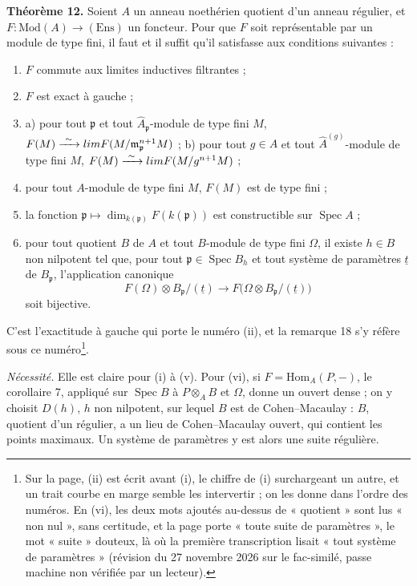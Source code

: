 \documentclass[11pt,a4paper]{article}
\begin{document}
\textbf{Théorème 12.} Soient $A$ un anneau noethérien quotient d'un anneau
régulier, et $F \colon \mathrm{Mod}(A) \to (\mathrm{Ens})$ un foncteur. Pour
que $F$ soit représentable par un module de type fini, il faut et il suffit
qu'il satisfasse aux conditions suivantes :
\begin{enumerate}
\item[(i)] $F$ commute aux limites inductives filtrantes ;
\item[(ii)] $F$ est exact à gauche ;
\item[(iii)] a) pour tout $\mathfrak{p}$ et tout
$\widehat{A}_{\mathfrak{p}}$-module de type fini $M$,
$F(M) \xrightarrow{\ \sim\ } \varprojlim F(M/\mathfrak{m}_{\mathfrak{p}}^{n+1}M)$ ;
b) pour tout $g \in A$ et tout $\widehat{A}^{(g)}$-module de type fini $M$,
$F(M) \xrightarrow{\ \sim\ } \varprojlim F(M/g^{n+1}M)$ ;
\item[(iv)] pour tout $A$-module de type fini $M$, $F(M)$ est de type fini ;
\item[(v)] la fonction $\mathfrak{p} \mapsto \dim_{k(\mathfrak{p})}
F(k(\mathfrak{p}))$ est constructible sur $\operatorname{Spec} A$ ;
\item[(vi)] pour tout quotient $B$ de $A$ et tout $B$-module de type fini
$\Omega$, il existe $h \in B$ non nilpotent tel que, pour tout
$\mathfrak{p} \in \operatorname{Spec} B_h$ et tout système de paramètres
$\underline{t}$ de $B_{\mathfrak{p}}$, l'application canonique
\[
  F(\Omega) \otimes B_{\mathfrak{p}}/(\underline{t}) \longrightarrow
  F\bigl(\Omega \otimes B_{\mathfrak{p}}/(\underline{t})\bigr)
\]
soit bijective.
\end{enumerate}
C'est l'exactitude à gauche qui porte le numéro (ii), et la remarque 18 s'y
réfère sous ce numéro\footnote{Sur la page, (ii) est écrit avant (i), le
chiffre de (i) surchargeant un autre, et un trait courbe en marge semble les
intervertir ; on les donne dans l'ordre des numéros. En (vi), les deux mots
ajoutés au-dessus de « quotient » sont lus « non nul », sans certitude, et la
page porte « toute suite de paramètres », le mot « suite » douteux, là où la
première transcription lisait « tout système de paramètres » (révision du 27
novembre 2026 sur le fac-similé, passe machine non vérifiée par un lecteur).}.

\emph{Nécessité.} Elle est claire pour (i) à (v). Pour (vi), si
$F = \mathrm{Hom}_A(P, -)$, le corollaire 7, appliqué sur
$\operatorname{Spec} B$ à $P \otimes_A B$ et $\Omega$, donne un ouvert dense ;
on y choisit $D(h)$, $h$ non nilpotent, sur lequel $B$ est de
Cohen--Macaulay : $B$, quotient d'un régulier, a un lieu de Cohen--Macaulay
ouvert, qui contient les points maximaux. Un système de paramètres y est alors
une suite régulière.
\end{document}
